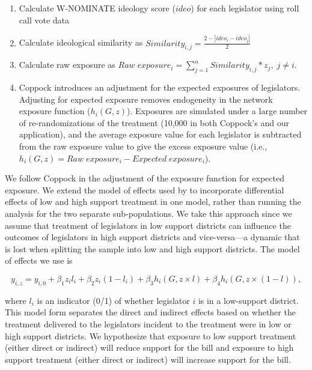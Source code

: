 \documentclass[12pt]{article}
\begin{document}
\begin{enumerate}
\item Calculate W-NOMINATE ideology score ($ideo$) for each legislator using roll call vote data

\item Calculate ideological similarity as $Similarity_{i,j} = \frac{2 - |ideo_i - ideo_j|}{2}$

\item Calculate raw exposure as $Raw\; exposure_i =  \sum_{j=1}^{n}Similarity_{i,j} * z_j, \; j \neq i$. 

\item Coppock introduces an adjustment for the expected exposures of legislators. Adjusting for expected exposure removes endogeneity in the network exposure function ($h_i(G,z)$).  Exposures are simulated under a large number of re-randomizations of the treatment (10,000 in both Coppock's and our application), and the average exposure value for each legislator is subtracted from the raw exposure value to give the excess exposure value (i.e., $h_i(G,z) = Raw\; exposure_i - Expected\; exposure_i$).

\end{enumerate}


We follow Coppock in the adjustment of the exposure function for expected exposure. We extend the model of effects used by \citet{coppock2014information} to incorporate differential effects of low and high support treatment in one model, rather than running the analysis for the two separate sub-populations. We take this approach since we assume that treatment of legislators in low support districts can influence the outcomes of legislators in high support districts and vice-versa---a dynamic that is lost when splitting the sample into low and high support districts.  The model of effects we use is 

$$y_{i,z} = y_{i,0}+\beta_1z_il_i+\beta_2z_i(1-l_i)+\beta_3h_i(G,z\times l)+\beta_4h_i(G,z\times (1-l)),$$

where $l_i$ is an indicator (0/1) of whether legislator $i$ is in a low-support district. This model form separates the direct and indirect effects based on whether the treatment delivered to the legislators incident to the treatment were in low or high support districts. We hypothesize that exposure to low support treatment (either direct or indirect) will reduce support for the bill and exposure to high support treatment (either direct or indirect) will increase support for the bill.
\end{document}
